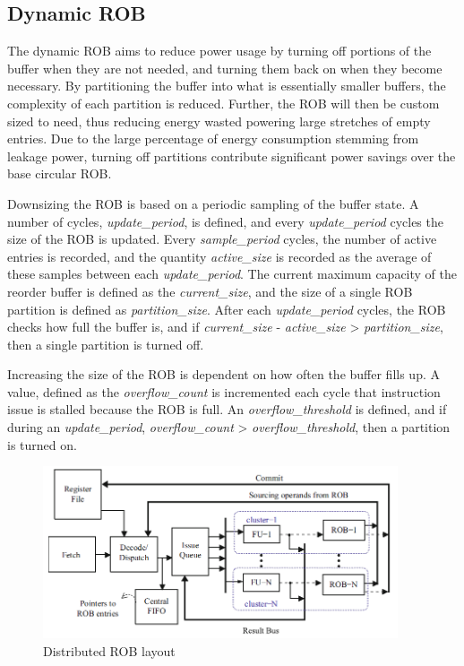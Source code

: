 \subsection{Dynamic ROB}

The dynamic ROB aims to reduce power usage by turning off portions of the buffer when they are not needed, and turning them back on when they become necessary. By partitioning the buffer into what is essentially smaller buffers, the complexity of each partition is reduced. Further, the ROB will then be custom sized to need, thus reducing energy wasted powering large stretches of empty entries. Due to the large percentage of energy consumption stemming from leakage power, turning off partitions contribute significant power savings over the base circular ROB.

Downsizing the ROB is based on a periodic sampling of the buffer state. A number of cycles, {\it update\_period}, is defined, and every {\it update\_period} cycles the size of the ROB is updated. Every {\it sample\_period} cycles, the number of active entries is recorded, and the quantity {\it active\_size} is recorded as the average of these samples between each {\it update\_period}. The current maximum capacity of the reorder buffer is defined as the {\it current\_size}, and the size of a single ROB partition is defined as {\it partition\_size}. After each {\it update\_period} cycles, the ROB checks how full the buffer is, and if {\it current\_size} - {\it active\_size} > {\it partition\_size}, then a single partition is turned off.

Increasing the size of the ROB is dependent on how often the buffer fills up. A value, defined as the {\it overflow\_count} is incremented each cycle that instruction issue is stalled because the ROB is full. An {\it overflow\_threshold} is defined, and if during an {\it update\_period}, {\it overflow\_count} > {\it overflow\_threshold}, then a partition is turned on.

\begin{figure}
\centering
\includegraphics[height=2in]{clusterROB.png}
\caption{Distributed ROB layout}
\label{fig:distrob}
\end{figure}


